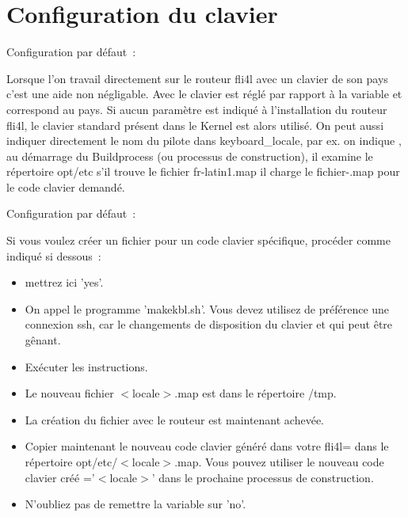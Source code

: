 
\section{Configuration du clavier}

\begin{description}

  Configuration par défaut~: 

  Lorsque l'on travail directement sur le routeur fli4l avec un clavier
  de son pays c'est une aide non négligable. Avec 
  le clavier est réglé par rapport à la variable  et correspond au
  pays. Si aucun paramètre  est indiqué à l'installation du routeur fli4l,
  le clavier standard présent dans le Kernel est alors utilisé. On peut
  aussi indiquer directement le nom du pilote dans keyboard\_locale, par ex. on
  indique , au démarrage du Buildprocess (ou processus de
  construction), il examine le répertoire opt/etc s'il trouve le fichier
  fr-latin1.map il charge le fichier-.map pour le code clavier demandé.


  Configuration par défaut~: 

  Si vous voulez créer un fichier pour un code clavier spécifique, procéder
  comme indiqué si dessous~:

\begin{itemize}
  \item {} mettrez ici 'yes'.
  \item On appel le programme 'makekbl.sh'. Vous devez utilisez de préférence
    une connexion ssh, car le changements de disposition du clavier et qui peut
    être gênant.
  \item Exécuter les instructions.
  \item Le nouveau fichier $<$locale$>$.map est dans le répertoire /tmp.
  \item La création du fichier avec le routeur est maintenant achevée.
  \item Copier maintenant le nouveau code clavier généré dans votre fli4l= dans
    le répertoire opt/etc/$<$locale$>$.map. Vous pouvez utiliser le nouveau code
    clavier créé ='$<$locale$>$' dans le prochaine processus
    de construction.
  \item N'oubliez pas de remettre la variable  sur 'no'.
\end{itemize}
\end{description}